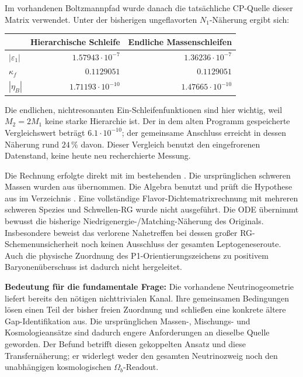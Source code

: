 Im vorhandenen Boltzmannpfad wurde danach die tatsächliche CP-Quelle dieser Matrix verwendet. Unter der bisherigen ungeflavorten $N_1$-Näherung ergibt sich:
\begin{center}
\begin{tabular}{lrr}
\toprule
 & Hierarchische Schleife & Endliche Massenschleifen\\\midrule
$|\varepsilon_1|$ & $1.57943\cdot10^{-7}$ & $1.36236\cdot10^{-7}$\\
$\kappa_f$ & $0.1129051$ & $0.1129051$\\
$|\eta_B|$ & $1.71193\cdot10^{-10}$ & $1.47665\cdot10^{-10}$\\\bottomrule
\end{tabular}
\end{center}
Die endlichen, nichtresonanten Ein-Schleifenfunktionen \cite{covirouletvissani} sind hier wichtig, weil $M_2=2M_1$ keine starke Hierarchie ist. Der in dem alten Programm gespeicherte Vergleichswert beträgt $6.1\cdot10^{-10}$; der gemeinsame Anschluss erreicht in dessen Näherung rund $24\,\%$ davon. Dieser Vergleich benutzt den eingefrorenen Datenstand, keine heute neu recherchierte Messung.

Die Rechnung erfolgte direkt mit  im bestehenden . Die ursprünglichen schweren Massen wurden aus  übernommen. Die Algebra benutzt  und prüft die Hypothese aus  im Verzeichnis . Eine vollständige Flavor-Dichtematrixrechnung mit mehreren schweren Spezies und Schwellen-RG wurde nicht ausgeführt. Die ODE übernimmt bewusst die bisherige Niedrigenergie-/Matching-Näherung des Originals. Insbesondere beweist das verlorene Nahetreffen bei dessen großer RG-Schemenunsicherheit noch keinen Ausschluss der gesamten Leptogeneseroute. Auch die physische Zuordnung des P1-Orientierungszeichens zu positivem Baryonenüberschuss ist dadurch nicht hergeleitet.



\textbf{Bedeutung für die fundamentale Frage:} Die vorhandene Neutrinogeometrie liefert bereits den nötigen nichttrivialen Kanal. Ihre gemeinsamen Bedingungen lösen einen Teil der bisher freien Zuordnung und schließen eine konkrete ältere Gap-Identifikation aus. Die ursprünglichen Massen-, Mischungs- und Kosmologieansätze sind dadurch engere Anforderungen an dieselbe Quelle geworden. Der Befund betrifft diesen gekoppelten Ansatz und diese Transfernäherung; er widerlegt weder den gesamten Neutrinozweig noch den unabhängigen kosmologischen $\Omega_b$-Readout.



